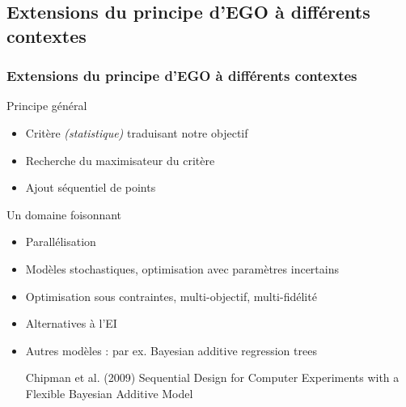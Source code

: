 \subsection{Extensions du principe d'EGO à différents contextes}
\begin{frame}
\frametitle{Extensions du principe d'EGO à différents contextes}

\begin{block}{Principe général}
\begin{itemize}
 \item Critère \textit{(statistique)} traduisant notre objectif
 \item Recherche du maximisateur du critère
 \item Ajout séquentiel de points
\end{itemize}
\end{block}

\begin{block}{Un domaine foisonnant}
\begin{itemize}
 \item Parallélisation
 \item Modèles stochastiques, optimisation avec paramètres incertains
 \item Optimisation sous contraintes, multi-objectif, multi-fidélité
  \item Alternatives à l'EI
 \item Autres modèles : par ex. Bayesian additive regression trees
 \scriptsize{
 \begin{thebibliography}{7}
\beamertemplatearticlebibitems
    Chipman et al. (2009)
         \newblock Sequential Design for Computer Experiments with a Flexible Bayesian Additive Model
 \end{thebibliography}}
\end{itemize}
\end{block}
\end{frame}

